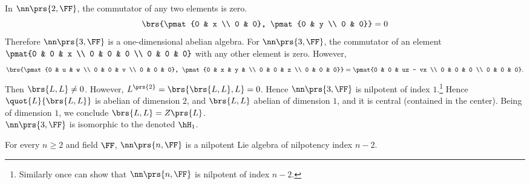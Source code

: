 \documentclass[10pt,a4paper,twoside,openany,hidelinks]{book}
\begin{document}
\begin{example}
In $\nn\prs{2,\FF}$, the commutator of any two elements is zero.
\[\brs{\pmat{0 & x \\ 0 & 0}, \pmat{0 & y \\ 0 & 0}} = 0\]
Therefore $\nn\prs{3,\FF}$ is a one-dimensional abelian algebra.
For $\nn\prs{3,\FF}$, the commutator of an element $\pmat{0 & 0 & x \\ 0 & 0 & 0 \\ 0 & 0 & 0}$ with any other element is zero. However,
\[\brs{\pmat{0 & u & w \\ 0 & 0 & v \\ 0 & 0 & 0}, \pmat{0 & x & y & \\ 0 & 0 & z \\ 0 & 0 & 0}} = \pmat{0 & 0 & uz - vx \\ 0 & 0 & 0 \\ 0 & 0 & 0}\text{.}\]
Then $\brs{L,L} \neq 0$. However, $L^{\prs{2}} = \brs{\brs{L,L},L} = 0$. Hence $\nn\prs{3,\FF}$ is nilpotent of index $1$.\footnote{Similarly once can show that $\nn\prs{n,\FF}$ is nilpotent of index $n-2$.}
Hence $\quot{L}{\brs{L,L}}$ is abelian of dimension $2$, and $\brs{L,L}$ abelian of dimension $1$, and it is central (contained in the center). Being of dimension $1$, we conclude $\brs{L,L} = Z\prs{L}$.\\
$\nn\prs{3,\FF}$ is isomorphic to the  denoted $\hH_1$.
\end{example}
\begin{proposition}
For every $n \geq 2$ and field $\FF$, $\nn\prs{n,\FF}$ is a nilpotent Lie algebra of nilpotency index $n-2$.
\end{proposition}
\end{document}
